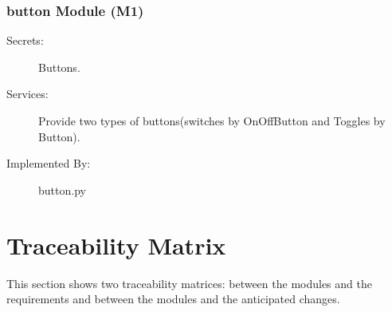 \documentclass[12pt, titlepage]{article}
\begin{document}
\subsubsection{button Module (M1)}
\begin{description}
\item[Secrets:]Buttons.
\item[Services:]Provide two types of buttons(switches by OnOffButton and Toggles by Button).
\item[Implemented By:] button.py
\end{description}


\section{Traceability Matrix} \label{SecTM}

This section shows two traceability matrices: between the modules and the
requirements and between the modules and the anticipated changes.
\end{document}
